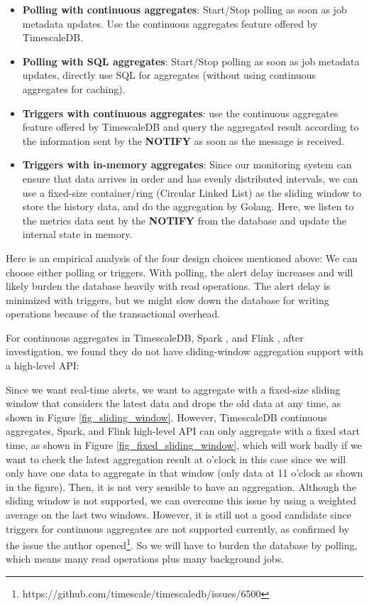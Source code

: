\begin{itemize}
    \item \textbf{Polling with continuous aggregates}: Start/Stop polling as soon as job metadata updates. Use the continuous aggregates feature offered by TimescaleDB.

    \item \textbf{Polling with SQL aggregates}: Start/Stop polling as soon as job metadata updates, directly use SQL for aggregates (without using continuous aggregates for caching).

    \item \textbf{Triggers with continuous aggregates}: use the continuous aggregates feature offered by TimescaleDB and query the aggregated result according to the information sent by the \textbf{NOTIFY} as soon as the message is received.

    \item \textbf{Triggers with in-memory aggregates}: Since our monitoring system can ensure that data arrives in order and has evenly distributed intervals, we can use a fixed-size container/ring (Circular Linked List) as the sliding window to store the history data, and do the aggregation by Golang. Here, we listen to the metrics data sent by the \textbf{NOTIFY} from the database and update the internal state in memory. %
\end{itemize}

Here is an empirical analysis of the four design choices mentioned above: We can choose either polling or triggers. With polling, the alert delay increases and will likely burden the database heavily with read operations. The alert delay is minimized with triggers, but we might slow down the database for writing operations because of the transactional overhead.

For continuous aggregates in TimescaleDB, Spark \cite{10.1145/2783258.2789993}, and Flink \cite{10.14778/3137765.3137777}, after investigation, we found they do not have sliding-window aggregation support with a high-level API:

Since we want real-time alerts, we want to aggregate with a fixed-size sliding window that considers the latest data and drops the old data at any time, as shown in Figure \ref{fig_sliding_window}. However, TimescaleDB continuous aggregates, Spark, and Flink high-level API can only aggregate with a fixed start time, as shown in Figure \ref{fig_fixed_sliding_window}, which will work badly if we want to check the latest aggregation result at o'clock in this case since we will only have one data to aggregate in that window (only data at 11 o'clock as shown in the figure). Then, it is not very sensible to have an aggregation. Although the sliding window is not supported, we can overcome this issue by using a weighted average on the last two windows. However, it is still not a good candidate since triggers for continuous aggregates are not supported currently, as confirmed by the issue the author opened\footnote{https://github.com/timescale/timescaledb/issues/6500}. So we will have to burden the database by polling, which means many read operations plus many background jobs.

